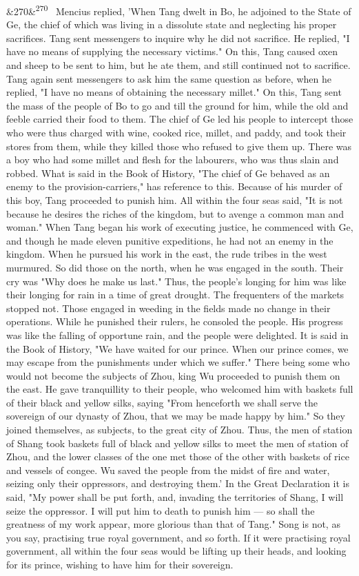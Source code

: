 \documentclass[12pt]{article}
\newcommand{\para}[1][]{\par\noindent\ifx&#1&\else\textsuperscript{\footnotesize #1}~\fi}
\begin{document}
\para[270] Mencius replied, 'When Tang dwelt in Bo, he adjoined to the State of Ge, the chief of which was living in a dissolute state and neglecting his proper sacrifices. Tang sent messengers to inquire why he did not sacrifice. He replied, "I have no means of supplying the necessary victims." On this, Tang caused oxen and sheep to be sent to him, but he ate them, and still continued not to sacrifice. Tang again sent messengers to ask him the same question as before, when he replied, "I have no means of obtaining the necessary millet." On this, Tang sent the mass of the people of Bo to go and till the ground for him, while the old and feeble carried their food to them. The chief of Ge led his people to intercept those who were thus charged with wine, cooked rice, millet, and paddy, and took their stores from them, while they killed those who refused to give them up. There was a boy who had some millet and flesh for the labourers, who was thus slain and robbed. What is said in the Book of History, "The chief of Ge behaved as an enemy to the provision-carriers," has reference to this. Because of his murder of this boy, Tang proceeded to punish him. All within the four seas said, "It is not because he desires the riches of the kingdom, but to avenge a common man and woman." When Tang began his work of executing justice, he commenced with Ge, and though he made eleven punitive expeditions, he had not an enemy in the kingdom. When he pursued his work in the east, the rude tribes in the west murmured. So did those on the north, when he was engaged in the south. Their cry was "Why does he make us last." Thus, the people's longing for him was like their longing for rain in a time of great drought. The frequenters of the markets stopped not. Those engaged in weeding in the fields made no change in their operations. While he punished their rulers, he consoled the people. His progress was like the falling of opportune rain, and the people were delighted. It is said in the Book of History, "We have waited for our prince. When our prince comes, we may escape from the punishments under which we suffer." There being some who would not become the subjects of Zhou, king Wu proceeded to punish them on the east. He gave tranquillity to their people, who welcomed him with baskets full of their black and yellow silks, saying "From henceforth we shall serve the sovereign of our dynasty of Zhou, that we may be made happy by him." So they joined themselves, as subjects, to the great city of Zhou. Thus, the men of station of Shang took baskets full of black and yellow silks to meet the men of station of Zhou, and the lower classes of the one met those of the other with baskets of rice and vessels of congee. Wu saved the people from the midst of fire and water, seizing only their oppressors, and destroying them.' In the Great Declaration it is said, "My power shall be put forth, and, invading the territories of Shang, I will seize the oppressor. I will put him to death to punish him --- so shall the greatness of my work appear, more glorious than that of Tang." Song is not, as you say, practising true royal government, and so forth. If it were practising royal government, all within the four seas would be lifting up their heads, and looking for its prince, wishing to have him for their sovereign. 
\end{document}
